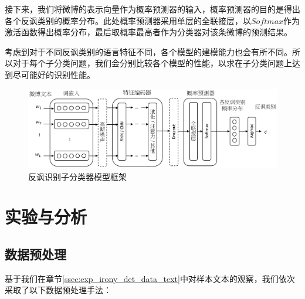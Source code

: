 接下来，我们将微博的表示向量作为概率预测器的输入，概率预测器的目的是得出各个反讽类别的概率分布。此处概率预测器采用单层的全联接层，以$Softmax$作为激活函数得出概率分布，最后取概率最高者作为分类器对该条微博的预测结果。

考虑到对于不同反讽类别的语言特征不同，各个模型的建模能力也会有所不同。所以对于每个子分类问题，我们会分别比较各个模型的性能，以求在子分类问题上达到尽可能好的识别性能。

\begin{figure}[H]
  \centering
  \includegraphics[width=\textwidth]{img/irony_det_cls_framework.pdf}
  \caption{反讽识别子分类器模型框架}
  \label{fig:irony_det_cls_framework}
\end{figure}

\section{实验与分析}
\label{sec:exp_irony_det_exp}

\subsection{数据预处理}
\label{ssec:exp_irony_det_text_preprocess}

基于我们在章节\ref{ssec:exp_irony_det_data_text}中对样本文本的观察，我们依次采取了以下数据预处理手法：

